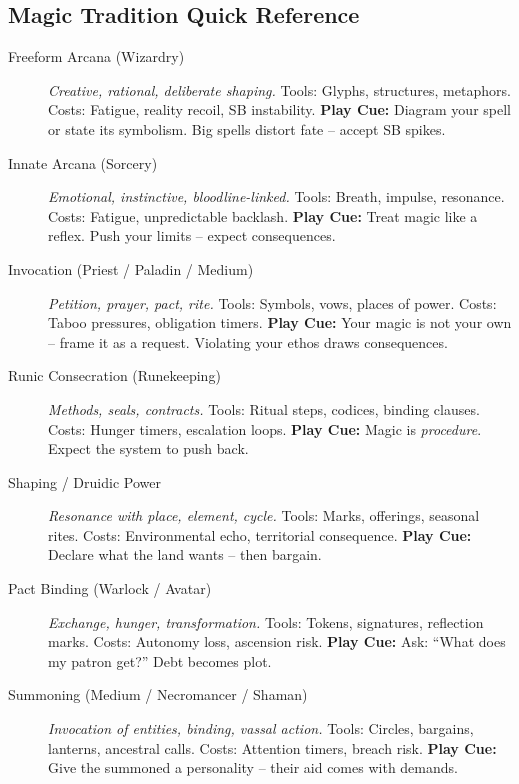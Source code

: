 \subsection{Magic Tradition Quick Reference}

\begin{description}
  \item[Freeform Arcana (Wizardry)] \textit{Creative, rational, deliberate shaping.} Tools: Glyphs, structures, metaphors. Costs: Fatigue, reality recoil, SB instability. \textbf{Play Cue:} Diagram your spell or state its symbolism. Big spells distort fate -- accept SB spikes.
  
  \item[Innate Arcana (Sorcery)] \textit{Emotional, instinctive, bloodline-linked.} Tools: Breath, impulse, resonance. Costs: Fatigue, unpredictable backlash. \textbf{Play Cue:} Treat magic like a reflex. Push your limits -- expect consequences.
  
  \item[Invocation (Priest / Paladin / Medium)] \textit{Petition, prayer, pact, rite.} Tools: Symbols, vows, places of power. Costs: Taboo pressures, obligation timers. \textbf{Play Cue:} Your magic is not your own -- frame it as a request. Violating your ethos draws consequences.
  
  \item[Runic Consecration (Runekeeping)] \textit{Methods, seals, contracts.} Tools: Ritual steps, codices, binding clauses. Costs: Hunger timers, escalation loops. \textbf{Play Cue:} Magic is \emph{procedure}. Expect the system to push back.
  
  \item[Shaping / Druidic Power] \textit{Resonance with place, element, cycle.} Tools: Marks, offerings, seasonal rites. Costs: Environmental echo, territorial consequence. \textbf{Play Cue:} Declare what the land wants -- then bargain.
  
  \item[Pact Binding (Warlock / Avatar)] \textit{Exchange, hunger, transformation.} Tools: Tokens, signatures, reflection marks. Costs: Autonomy loss, ascension risk. \textbf{Play Cue:} Ask: ``What does my patron get?'' Debt becomes plot.
  
  \item[Summoning (Medium / Necromancer / Shaman)] \textit{Invocation of entities, binding, vassal action.} Tools: Circles, bargains, lanterns, ancestral calls. Costs: Attention timers, breach risk. \textbf{Play Cue:} Give the summoned a personality -- their aid comes with demands.
\end{description}

